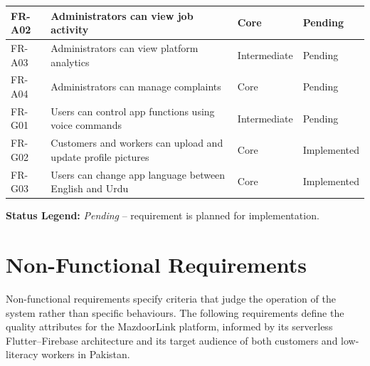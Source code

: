 \begin{longtable}{|>{\centering\arraybackslash}p{1.5cm}|>{\raggedright\arraybackslash}p{7.0cm}|>{\centering\arraybackslash}p{2.2cm}|>{\centering\arraybackslash}p{2.5cm}|}
FR-A02 & Administrators can view job activity & Core & Pending \\ \hline
FR-A03 & Administrators can view platform analytics & Intermediate & Pending \\ \hline
FR-A04 & Administrators can manage complaints & Core & Pending \\ \hline
FR-G01 & Users can control app functions using voice commands & Intermediate & Pending \\ \hline
FR-G02 & Customers and workers can upload and update profile pictures & Core & Implemented \\ \hline
FR-G03 & Users can change app language between English and Urdu & Core & Implemented \\
\end{longtable}

\vspace{6pt}
\noindent
\textbf{Status Legend:} \textit{Pending} -- requirement is planned for implementation.

\newpage

\section{Non-Functional Requirements}

Non-functional requirements specify criteria that judge the operation of the
system rather than specific behaviours. The following requirements define the
quality attributes for the MazdoorLink platform, informed by its serverless
Flutter--Firebase architecture and its target audience of both customers and
low-literacy workers in Pakistan.

\vspace{8pt}


